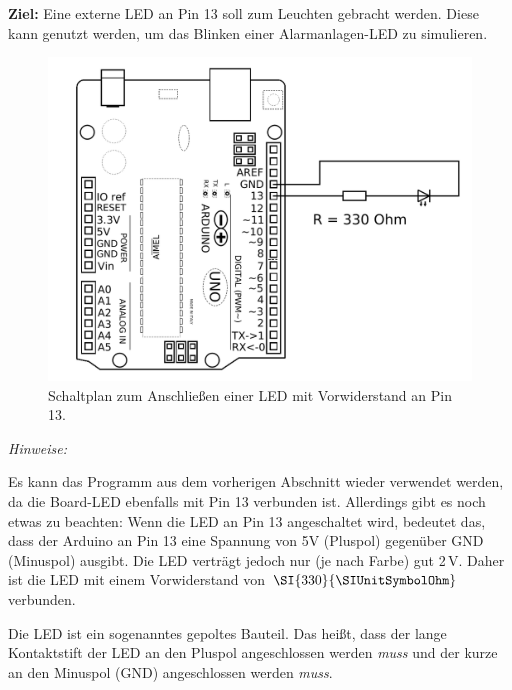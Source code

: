 \begin{ziel}
	\textbf{Ziel:} Eine externe LED an Pin 13 soll zum Leuchten gebracht werden. Diese kann genutzt werden, um das Blinken einer Alarmanlagen-LED zu simulieren.
\end{ziel}

\medskip
\begin{minipage}{0.48\textwidth}
	\begin{figure}[H]
		\centering
		\includegraphics[width=\textwidth]{./Zeichnungen/Schaltplan-LED.png}
		\caption{Schaltplan zum Anschließen einer LED mit Vorwiderstand an Pin 13.}
	\end{figure}
\end{minipage}
\hfill
\begin{minipage}{0.5\textwidth}
	\emph{Hinweise:} 
	
	Es kann das Programm aus dem vorherigen Abschnitt wieder verwendet werden, da die Board-LED ebenfalls mit Pin 13 verbunden ist. Allerdings gibt es noch etwas zu beachten: Wenn die LED an Pin 13 angeschaltet wird, bedeutet das, dass der Arduino an Pin 13 eine Spannung von 5V (Pluspol) gegenüber GND (Minuspol) ausgibt. Die LED verträgt jedoch nur (je nach Farbe) gut 2\,V. Daher ist die LED mit einem Vorwiderstand von $\SI{330}{\SIUnitSymbolOhm}$ verbunden.
	
	Die LED ist ein sogenanntes gepoltes Bauteil. Das heißt, dass der lange Kontaktstift der LED an den Pluspol angeschlossen werden \emph{muss} und der kurze an den Minuspol (GND) angeschlossen werden \emph{muss}.
\end{minipage}
